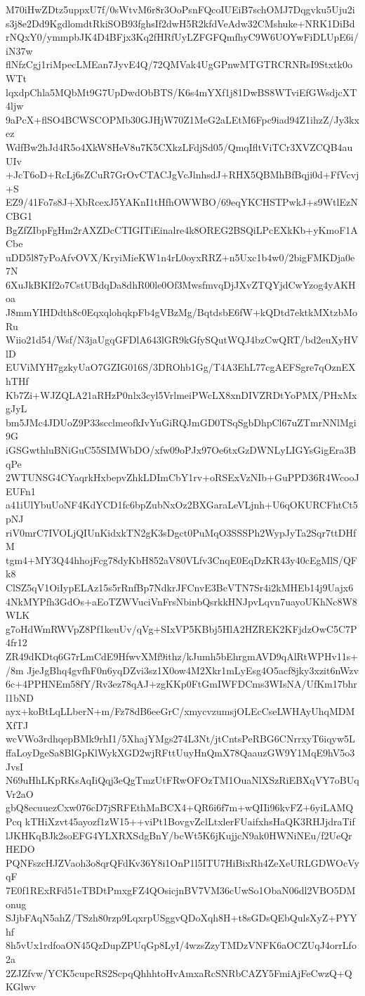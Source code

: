M70iHwZDtz5uppxU7f/0sWtvM6r8r3OoPsnFQcoIUEiB7schOMJ7Dqgvku5Uju2i
s3j8e2Dd9KgdlomdtRkiSOB93fghsIf2dwH5R2kfdVeAdw32CMshuke+NRK1DiBd
rNQxY0/ymmpbJK4D4BFjx3Kq2fHRfUyLZFGFQmfhyC9W6UOYwFiDLUpE6i/iN37w
flNfzCgj1riMpecLMEan7JyvE4Q/72QMVak4UgGPnwMTGTRCRNRsI9Stxtk0oWTt
lqxdpChla5MQbMt9G7UpDwdObBTS/K6s4mYXf1j81DwBS8WTviEfGWsdjcXT4ljw
9aPcX+flSO4BCWSCOPMb30GJHjW70Z1MeG2aLEtM6Fpc9iad94Z1ihzZ/Jy3kxez
WdfBw2hJd4R5o4XkW8HeV8u7K5CXkzLFdjSd05/QmqIfltViTCr3XVZCQB4auUIv
+JcT6oD+RcLj6sZCuR7GrOvCTACJgVcJlnhsdJ+RHX5QBMhBfBqji0d+FfVcvj+S
EZ9/41Fo7s8J+XbRcexJ5YAKnI1tHfhOWWBO/69eqYKCHSTPwkJ+s9WtlEzNCBG1
BgZfZIbpFgHm2rAXZDcCTIGITiEinalre4k8OREG2BSQiLPcEXkKb+yKmoF1ACbe
uDD5l87yPoAfvOVX/KryiMieKW1n4rL0oyxRRZ+n5Uxc1b4w0/2bigFMKDja0e7N
6XuJkBKIf2o7CstUBdqDa8dhR00le0Of3MwsfmvqDjJXvZTQYjdCwYzog4yAKHoa
J8mmYIHDdth8c0EqxqlohqkpFb4gVBzMg/BqtdsbE6fW+kQDtd7ektkMXtzbMoRu
Wiio21d54/Wsf/N3jaUgqGFDlA643lGR9kGfySQutWQJ4bzCwQRT/bd2euXyHVlD
EUViMYH7gzkyUaO7GZIG016S/3DROhb1Gg/T4A3EhL77cgAEFSgre7qOznEXhTHf
Kb7Zi+WJZQLA21aRHzP0nlx3cyl5VrlmeiPWcLX8xnDIVZRDtYoPMX/PHxMxgJyL
bm5JMc4JDUoZ9P33scclmeofkIvYuGiRQJmGD0TSqSgbDhpCl67uZTmrNNlMgi9G
iGSGwthluBNiGuC55SIMWbDO/xfw09oPJx97Oe6txGzDWNLyLIGYsGigEra3BqPe
2WTUNSG4CYaqrkHxbepvZhkLDImCbY1rv+oRSExVzNIb+GuPPD36R4WcooJEUFn1
a41iUlYbuUoNF4KdYCD1fc6bpZubNxOz2BXGaraLeVLjnh+U6qOKURCFhtCt5pNJ
riV0mrC7IVOLjQIUnKidxkTN2gK3sDgct0PuMqO3SSSPh2WypJyTa2Sqr7ttDHfM
tgm4+MY3Q44hhojFcg78dyKbH852aV80VLfv3CnqE0EqDzKR43y40cEgMlS/QFk8
ClSZ5qV1OiIypELAz15s5rRnfBp7NdkrJFCnvE3BcVTN7Sr4i2kMHEb14j9Uajx6
4NkMYPfh3GdOs+aEoTZWVuciVnFrsNbinbQsrkkHNJpvLqvn7uayoUKhNc8W8WLK
g7oHdWmRWVpZ8Pf1keuUv/qVg+SIxVP5KBbj5HlA2HZREK2KFjdzOwC5C7P4fr12
ZR49dKDtq6G7rLmCdE9HfwvXMf9ithz/kJumh5bEhrgmAVD9qAlRtWPHv11s+/8m
JjeJgBhq4gvfhF0n6yqDZvi3sz1X0ow4M2Xkr1mLyEsg4O5acf8jky3xzit6nWzv
6c+4PPHNEm58fY/Rv3ez78qAJ+zgKKp0FtGmIWFDCms3WIsNA/UfKm17bhrl1bND
ayx+koBtLqLLberN+m/Fz78dB6eeGrC/xmycvzumsjOLEcCseLWHAyUhqMDMXfTJ
wcVWo3rdhqepBMk9rhI1/5XhajYMgs274L3Nt/jtCntsPeRBG6CNrrxyT6iqyw5L
ffaLoyDgeSa8BlGpKlWykXGD2wjRFttUuyHnQmX78QaauzGW9Y1MqE9hV5o3JvsI
N69uHhLKpRKsAqIiQqj3eQgTmzUtFRwOFOzTM1OuaNlXSzRiEBXqVY7oBUqVr2aO
gbQ8ecuuezCxw076cD7jSRFEthMaBCX4+QR6i6f7m+wQIIi96kvFZ+6yiLAMQPcq
kTHiXzvt45ayozf1zW15++viPt1BovgvZclLtxlerFUaifxhsHaQK3RHJjdraTif
lJKHKqBJk2soEFG4YLXRXSdgBnY/bcWt5K6jKujjcN9ak0HWNiNEu/f2UeQrHEDO
PQNFszcHJZVaoh3o8qrQFdKv36Y8i1OnP1l5ITU7HiBixRh4ZeXeURLGDWOcVyqF
7E0f1RExRFd51eTBDtPmxgFZ4QOsicjnBV7VM36cUwSo1ObaN06dl2VBO5DMonug
SJjbFAqN5ahZ/TSzh80rzp9LqxrpUSggvQDoXqh8H+t8sGDsQEbQulsXyZ+PYYhf
8h5vUx1rdfoaON45QzDupZPUqGp8LyI/4wzsZzyTMDzVNFK6aOCZUqJ4orrLfo2a
2ZJZfvw/YCK5cupcRS2ScpqQhhhtoHvAmxaRcSNRbCAZY5FmiAjFeCwzQ+QKGlwv
